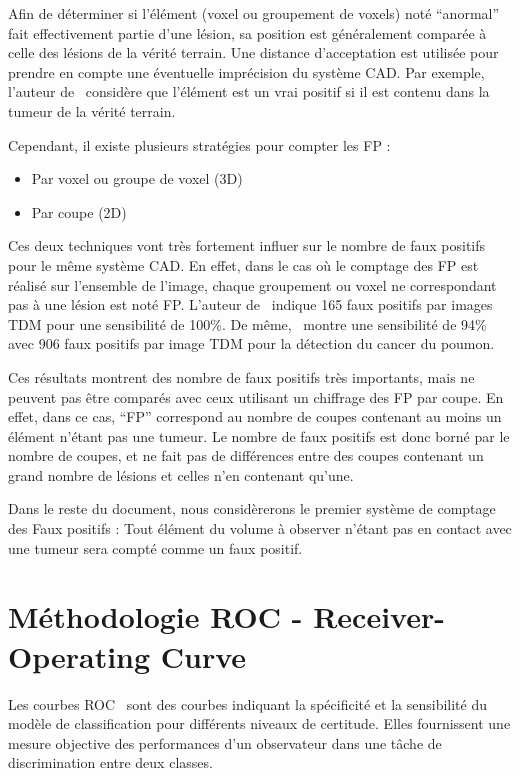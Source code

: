 Afin de déterminer si l'élément (voxel ou groupement de voxels) noté ``anormal'' fait effectivement partie d'une lésion, sa  position est généralement comparée à celle des lésions de la vérité terrain. Une distance d'acceptation est utilisée pour prendre en compte une éventuelle imprécision du système CAD. Par exemple, l'auteur de~\cite{paik2004surface} considère que l'élément est un vrai positif si il est contenu dans la tumeur de la vérité terrain.

Cependant, il existe plusieurs stratégies pour compter les FP :
\begin{itemize}
 \item Par voxel ou groupe de voxel (3D)
 \item Par coupe (2D)
\end{itemize}

Ces deux techniques vont très fortement influer sur le nombre de faux positifs pour le même système CAD. En effet, dans le cas où le comptage des FP est réalisé sur l'ensemble de l'image, chaque groupement ou voxel ne correspondant pas à une lésion est noté FP. L'auteur de~\cite{paik2004surface} indique 165 faux positifs par images TDM pour une sensibilité de 100\%. De même,~\cite{zhao2003automatic} montre une sensibilité de 94\% avec 906 faux positifs par image TDM pour la détection du cancer du poumon.  

Ces résultats montrent des nombre de faux positifs très importants, mais ne peuvent pas être comparés avec ceux utilisant un chiffrage des FP par coupe. En effet, dans ce cas, ``FP'' correspond au nombre de coupes contenant au moins un élément n'étant pas une tumeur. Le nombre de faux positifs est donc borné par le nombre de coupes, et ne fait pas de différences entre des coupes contenant un grand nombre de lésions et celles n'en contenant qu'une. 

Dans le reste du document, nous considèrerons le premier système de comptage des Faux positifs : Tout élément du volume à observer n'étant pas en contact avec une tumeur sera compté comme un faux positif.


	\section{Méthodologie ROC - Receiver-Operating Curve}

Les courbes ROC~\cite{swets1982evaluation,metz1986roc} sont des courbes indiquant la spécificité et la sensibilité du modèle de classification pour différents niveaux de certitude. Elles fournissent une mesure objective des performances d'un observateur dans une tâche de discrimination entre deux classes. 


